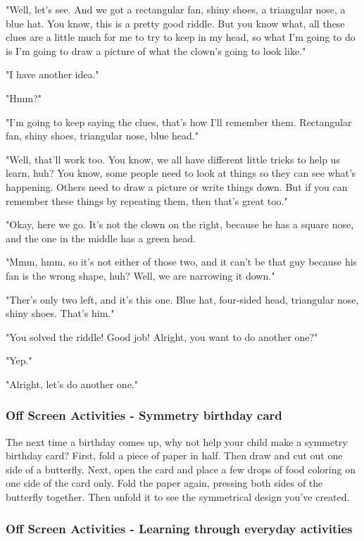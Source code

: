 "Well, let's see. And we got a rectangular fan, shiny shoes, a triangular nose, a blue hat.
You know, this is a pretty good riddle.
But you know what, all these clues are a little much for me to try to keep in my head, so what I'm going to do is I'm going to draw a picture of what the clown's going to look like."

"I have another idea."

"Hmm?"

"I'm going to keep saying the clues, that's how I'll remember them.
Rectangular fan, shiny shoes, triangular nose, blue head."

"Well, that'll work too.
You know, we all have different little tricks to help us learn, huh?
You know, some people need to look at things so they can see what's happening.
Others need to draw a picture or write things down.
But if you can remember these things by repeating them, then that's great too."

"Okay, here we go.
It's not the clown on the right, because he has a square nose, and the one in the middle has a green head.

"Mmm, hmm, so it's not either of those two, and it can't be that guy because his fan is the wrong shape, huh?
Well, we are narrowing it down."

"Ther's only two left, and it's this one.
Blue hat, four-sided head, triangular nose, shiny shoes. That's him."

"You solved the riddle!
Good job!
Alright, you want to do another one?"

"Yep."

"Alright, let's do another one."

\subsubsection{Off Screen Activities - Symmetry birthday card}

The next time a birthday comes up, why not help your child make a symmetry birthday card?
First, fold a piece of paper in half.
Then draw and cut out one side of a butterfly.
Next, open the card and place a few drops of food coloring on one side of the card only.
Fold the paper again, pressing both sides of the butterfly together.
Then unfold it to see the symmetrical design you've created.

\subsubsection{Off Screen Activities - Learning through everyday activities}

